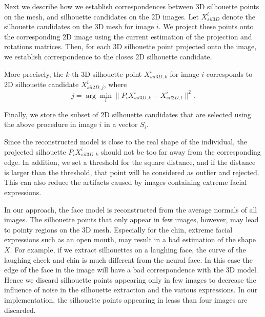 Next we describe how we establish correspondences between 3D silhouette points on the mesh, and silhouette candidates on the 2D images. Let $X_{sil3D}^i$ denote the silhouette candidates on the 3D mesh for image $i$. We project these points onto the corresponding 2D image using the current estimation of the projection and rotations matrices. Then, for each 3D silhouette point projected onto the image, we establish correspondence to the closes 2D silhouette candidate.

More precisely, the $k$-th 3D silhouette point $X_{sil3D,k}^{i}$ for image $i$ corresponds to 2D silhouette candidate $X_{sil2D,j}^i$, where 
%
\begin{displaymath}
j = \arg{\min}_{l} \|P_{i} X_{sil3D,k}^{i} - X_{sil2D,l}^{i}\|^2.
\end{displaymath} 
%

Finally, we store the subset of 2D silhouette candidates that are selected using the above procedure in image $i$ in a vector $S_i$.

Since the reconstructed model is close to the real shape of the individual, the projected silhouette $P_i X_{sil3D,k}^{i}$ should not be too far away from the corresponding edge. In addition, we set a threshold for the square distance, and if the distance is larger than the threshold, that point will be considered as outlier and rejected. This can also reduce the artifacts caused by images containing extreme facial expressions.



In our approach, the face model is reconstructed from the average normals of all images. The silhouette points that only appear in few images, however, may lead to pointy regions on the 3D mesh. Especially for the chin, extreme facial expressions such as an open mouth, may result in a bad estimation of the shape $X$. For example, if we extract silhouettes on a laughing face, the curve of the laughing cheek and chin is much different from the neural face. In this case the edge of the face in the image will have a bad correspondence with the 3D model. 
Hence we discard silhouette points appearing only in few images to decrease the influence of noise in the silhouette extraction and the various expressions. In our implementation, the silhouette points appearing in leass than four images are discarded.


